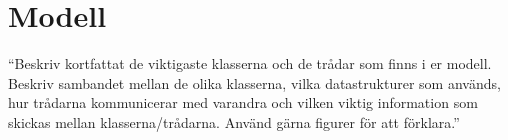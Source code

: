 \section{Modell}


“Beskriv kortfattat de viktigaste klasserna och de trådar som finns i er modell. Beskriv sambandet mellan de olika klasserna, vilka datastrukturer som används, hur trådarna kommunicerar med varandra och vilken viktig information som skickas mellan klasserna/trådarna.
Använd gärna figurer för att förklara.”
